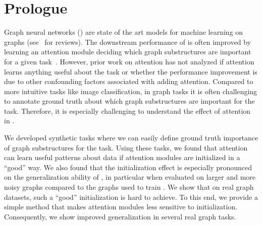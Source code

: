 \section*{Prologue}


\vspace{5pt}
Graph neural networks (\gnns) are state of the art models for machine learning on graphs (see~\citep{wu2020comprehensive,bronstein2017geometric,hamilton2017representation} for reviews). The downstream performance of \gnns is often improved by learning an attention module deciding which graph substructures are important for a given task~\citep{graphunet2018}. However, prior work on attention has not analyzed if attention learns anything useful about the task or whether the performance improvement is due to other confounding factors associated with adding attention. Compared to more intuitive tasks like image classification, in graph tasks it is often challenging to annotate ground truth about which graph substructures are important for the task. Therefore, it is especially challenging to understand the effect of attention in \gnns.


We developed synthetic tasks where we can easily define ground truth importance of graph substructures for the task. Using these tasks, we found that attention can learn useful patterns about data if attention modules are initialized in a ``good'' way. We also found that the initialization effect is especially pronounced on the generalization ability of \gnns, in particular when evaluated on larger and more noisy graphs compared to the graphs used to train \gnns.
We show that on real graph datasets, such a ``good'' initialization is hard to achieve. To this end, we provide a simple method that makes attention modules less sensitive to initialization. Consequently, we show improved generalization in several real graph tasks.


